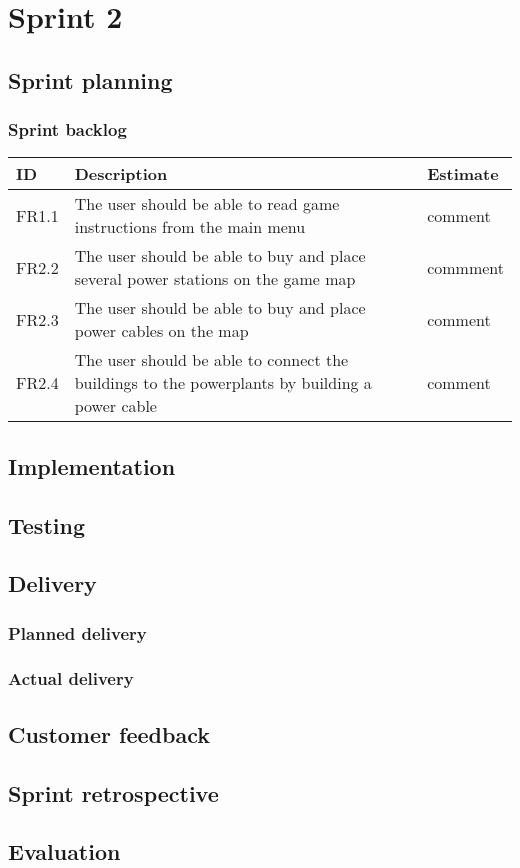 \section{Sprint 2}

\subsection{Sprint planning}
\subsubsection{Sprint backlog}
\begin{tabular}{| p{1cm} | p{8cm} | p{3cm} |}
	\hline
	ID & Description & Estimate \\ \hline
	FR1.1 & The user should be able to read game instructions from the main menu & comment \\ \hline
	FR2.2 & The user should be able to buy and place several power stations on the game map 
	& commment \\ \hline
	FR2.3 & The user should be able to buy and place power cables on the map & comment \\ \hline
	FR2.4 & The user should be able to connect the buildings to the powerplants by 
	building a power cable & comment \\ \hline
\end{tabular}
\subsection{Implementation}


\subsection{Testing}
\subsection{Delivery}
\subsubsection{Planned delivery}
\subsubsection{Actual delivery}
\subsection{Customer feedback}
\subsection{Sprint retrospective}
\subsection{Evaluation}